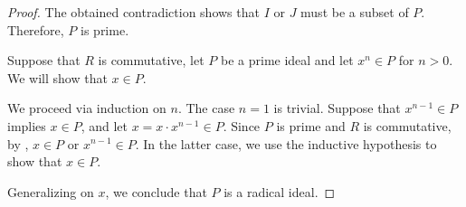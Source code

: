 \begin{proof}
  The obtained contradiction shows that \( I \) or \( J \) must be a subset of \( P \). Therefore, \( P \) is prime.

   Suppose that \( R \) is commutative, let \( P \) be a prime ideal and let \( x^n \in P \) for \( n > 0 \). We will show that \( x \in P \).

  We proceed via induction on \( n \). The case \( n = 1 \) is trivial. Suppose that \( x^{n-1} \in P \) implies \( x \in P \), and let \( x = x \cdot x^{n-1} \in P \). Since \( P \) is prime and \( R \) is commutative, by , \( x \in P \) or \( x^{n-1} \in P \). In the latter case, we use the inductive hypothesis to show that \( x \in P \).

  Generalizing on \( x \), we conclude that \( P \) is a radical ideal.
\end{proof}

